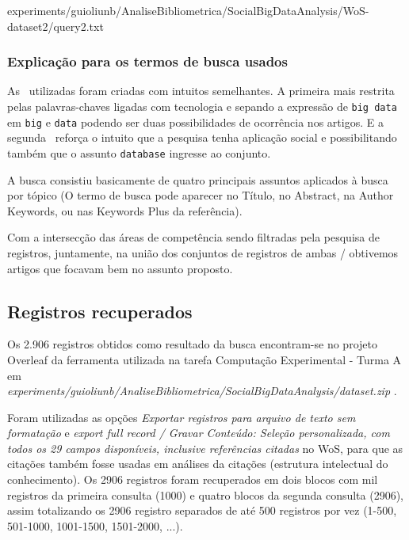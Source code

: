 
{experiments/guioliunb/AnaliseBibliometrica/SocialBigDataAnalysis/WoS-dataset2/query2.txt}

\subsubsection{Explicação para os termos de busca usados\label{MASSA:query}}

As \querys\ utilizadas foram criadas com intuitos semelhantes. A primeira mais restrita pelas palavras-chaves ligadas com tecnologia e sepando a expressão de \texttt{big data} em \texttt{big} e \texttt{data} podendo ser duas possibilidades de ocorrência nos artigos. E a segunda \query\ reforça o intuito que a pesquisa tenha aplicação social e possibilitando também que o assunto  \texttt{database} ingresse ao conjunto.

A busca consistiu basicamente de quatro principais  assuntos aplicados à busca por tópico (O termo de busca pode aparecer no Título, no Abstract, na Author Keywords, ou nas Keywords Plus da referência).

Com a intersecção das áreas de competência sendo filtradas pela pesquisa de registros, juntamente, na união dos conjuntos de registros de ambas \querys/ obtivemos artigos que focavam bem no assunto proposto.

\subsection{Registros recuperados}

Os 2.906 registros obtidos como resultado da busca encontram-se no projeto Overleaf da ferramenta utilizada na tarefa Computação Experimental - Turma A em \textit{experiments/guioliunb/AnaliseBibliometrica/SocialBigDataAnalysis/dataset.zip} . 

Foram utilizadas as opções \textit{Exportar registros para arquivo de texto sem formatação} e \textit{export full record / Gravar Conteúdo: Seleção personalizada, com todos os 29 campos disponíveis, inclusive referências citadas} no WoS, para que as citações também fosse usadas em análises da citações (estrutura intelectual do conhecimento). Os 2906 registros foram recuperados em dois blocos com mil registros da primeira consulta (1000) e quatro blocos da segunda consulta (2906), assim totalizando os 2906 registro  separados de até 500 registros por vez (1-500, 501-1000, 1001-1500, 1501-2000, ...).

